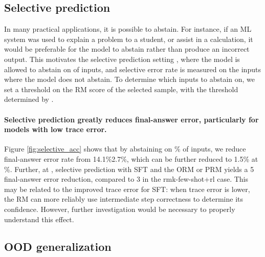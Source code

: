 \documentclass[11pt, a4paper, logo]{deepmind}
\newcommand{\Short}[1]{\csname rmk-#1\endcsname}
\newcommand{\fewshotANDrl}{\Short{few-shot+rl}}
\begin{document}
\subsection{Selective prediction}
\label{subsec:selective}

In many practical applications, it is possible to abstain. For instance, if an ML system was used to explain a problem to a student, or assist in a calculation, it would be preferable for the model to abstain rather than produce an incorrect output.
This motivates the selective prediction setting \citep{el2010foundations, geifman2017selective}, where the model is allowed to abstain on  of inputs, and selective error rate is measured on the inputs where the model does not abstain.
To determine which inputs to abstain on, we set a threshold on the RM score of the selected sample, with the threshold determined by .

\paragraph{Selective prediction greatly reduces final-answer error, particularly for models with low trace error.}
Figure \ref{fig:selective_acc} shows that by abstaining on \% of inputs, we reduce final-answer error rate from 14.1\%2.7\%, which can be further reduced to 1.5\% at \%.
Further, at , selective prediction with SFT and the ORM or PRM yields a 5 final-answer error reduction, compared to 3 in the \fewshotANDrl{} case.
This may be related to the improved trace error for SFT: 
when trace error is lower, the RM can more reliably use intermediate step correctness to determine its confidence.
However, further investigation would be necessary to properly understand this effect.

\subsection{OOD generalization}
\label{subsec:ood}
\end{document}
